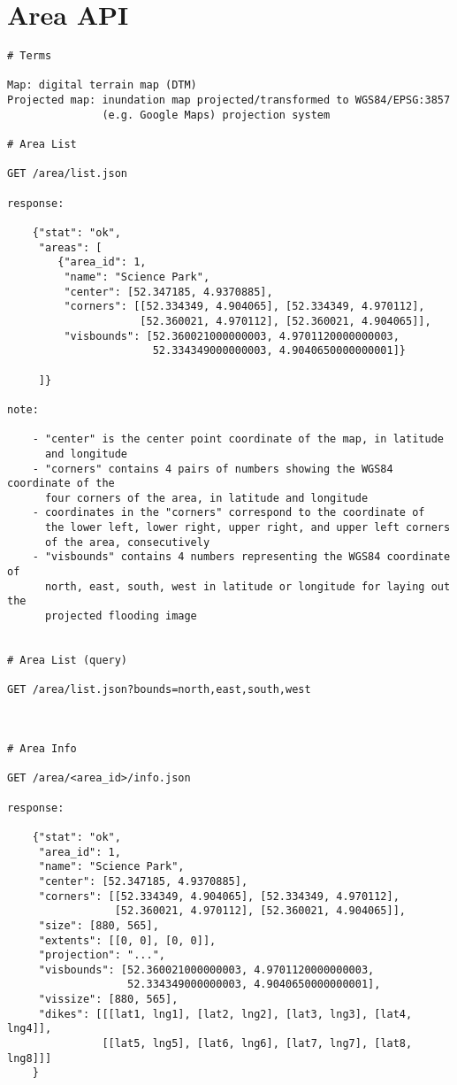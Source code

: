 \section{Area API}
\label{sec:area_api}
\begin{lstlisting}
# Terms

Map: digital terrain map (DTM)
Projected map: inundation map projected/transformed to WGS84/EPSG:3857
               (e.g. Google Maps) projection system

# Area List

GET /area/list.json

response:

    {"stat": "ok",
     "areas": [
        {"area_id": 1,
         "name": "Science Park",
         "center": [52.347185, 4.9370885],
         "corners": [[52.334349, 4.904065], [52.334349, 4.970112],
                     [52.360021, 4.970112], [52.360021, 4.904065]],
         "visbounds": [52.360021000000003, 4.9701120000000003,
                       52.334349000000003, 4.9040650000000001]}

     ]}

note:

    - "center" is the center point coordinate of the map, in latitude
      and longitude
    - "corners" contains 4 pairs of numbers showing the WGS84 coordinate of the
      four corners of the area, in latitude and longitude
    - coordinates in the "corners" correspond to the coordinate of
      the lower left, lower right, upper right, and upper left corners
      of the area, consecutively
    - "visbounds" contains 4 numbers representing the WGS84 coordinate of
      north, east, south, west in latitude or longitude for laying out the
      projected flooding image


# Area List (query)

GET /area/list.json?bounds=north,east,south,west



# Area Info

GET /area/<area_id>/info.json

response:

    {"stat": "ok",
     "area_id": 1,
     "name": "Science Park",
     "center": [52.347185, 4.9370885],
     "corners": [[52.334349, 4.904065], [52.334349, 4.970112],
                 [52.360021, 4.970112], [52.360021, 4.904065]],
     "size": [880, 565],
     "extents": [[0, 0], [0, 0]],
     "projection": "...",
     "visbounds": [52.360021000000003, 4.9701120000000003,
                   52.334349000000003, 4.9040650000000001],
     "vissize": [880, 565],
     "dikes": [[[lat1, lng1], [lat2, lng2], [lat3, lng3], [lat4, lng4]],
               [[lat5, lng5], [lat6, lng6], [lat7, lng7], [lat8, lng8]]]
    }


\end{lstlisting}
